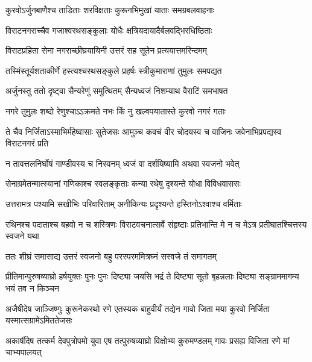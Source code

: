 \twolineshloka
{कुरवोऽर्जुनबाणैश्च ताडिताः शरविक्षताः}
{कुरूनभिमुखां याताः समग्रबलवाहनाः}


\twolineshloka
{विराटनगराच्चैव गजाश्वरथसङ्कुलाः}
{योधैः क्षत्रियदायादैर्बलवद्भिरधिष्ठिताः}


\twolineshloka
{विराटप्रहिता सेना नगराच्छीघ्रयायिनी}
{उत्तरं सह सूतेन प्रत्ययात्तमरिन्दमम्}


\twolineshloka
{तस्मिंस्तूर्यशताकीर्णे हस्त्यश्चरथसङ्कुले}
{प्रहर्षः स्त्रीकुमाराणां तुमुलः समपद्यत}


\twolineshloka
{अर्जुनस्तु ततो दृष्ट्वा सैन्यरेणुं समुत्थितम्}
{सैन्यध्वजं निशम्याथ वैराटिं समभाषत}


\twolineshloka
{नगरे तुमुलः शब्दो रेणुश्चाऽऽक्रमते नभः}
{किं नु खल्वपयातास्ते कुरवो नगरं गताः}


\threelineshloka
{ते चैव निर्जिताऽस्माभिर्महेष्वासाः सुतेजसः}
{आमुञ्च कवचं वीर चोदयस्व च वाजिनः}
{जवेनाभिप्रपद्यस्व विराटनगरं प्रति}


\twolineshloka
{न तावत्तलनिर्घोषं गाण्डीवस्य च निस्वनम्}
{ध्वजं वा दर्शयिष्यामि अथवा स्वजनो भवेत्}




\twolineshloka
{सेनाग्रमेतन्मात्स्यानां गणिकाश्च स्वलङ्कृताः}
{कन्या रथेषु दृश्यन्ते योधा विविधवाससः}


\twolineshloka
{उत्तरामत्र पश्यामि सखीभिः परिवारिताम्}
{अनीकिन्यः प्रदृश्यन्ते हस्तिनोऽश्वाश्च वर्मिताः}


\threelineshloka
{रथिनश्च पदाताश्च बहवो न च शस्त्रिणः}
{विराटवचनात्सर्वे संहृष्टाः प्रतिभान्ति मे}
{न च मेऽत्र प्रतीघातश्चित्तस्य स्वजने यथा}



\twolineshloka
{ततः शीघ्रं समासाद्य उत्तरं स्वजनो बहु}
{परस्परममित्रघ्नं सस्वजे तं समागतम्}




\threelineshloka
{प्रीतिमान्पुरुषव्याघ्रो हर्षयुक्तः पुनः पुनः}
{दिष्ट्या जयसि भद्रं ते दिष्ट्या सूतो बृहन्नलाः}
{दिष्ट्या सङ्ग्राममागम्य भयं तव न किञ्चन}




\threelineshloka
{अजैषीदेष जाञ्जिष्णुः कुरूनेकरथो रणे}
{एतस्यक बाहुवीर्यं तद्येन गावो जिता मया}
{कुरवो निर्जिता यस्मात्सग्रामेऽमिततेजसः}


\threelineshloka
{अकार्षीदेष तत्कर्म देवपुत्रोपमो युवा}
{एष तत्पुरुषव्याघ्रो विक्षोभ्य कुरुमण्डलम्}
{गावः प्रसह्य विजिता रणे मां चाभ्यपालयत्}


